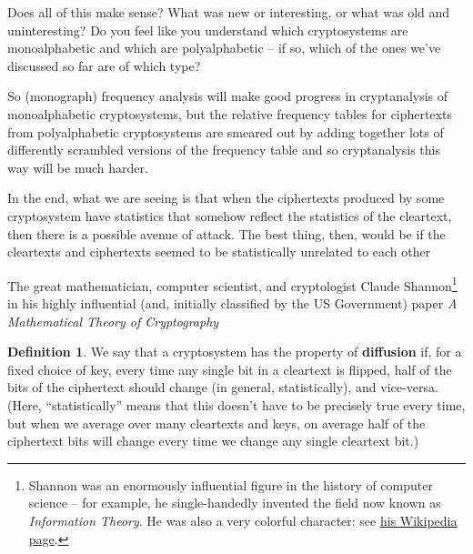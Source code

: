 \documentclass[12pt,letterpaper]{amsbook}
\theoremstyle{definition}
\newtheorem{definition}[theorem]{Definition}
\theoremstyle{remark}
\numberwithin{figure}{section}
\numberwithin{exercise}{chapter}
\numberwithin{section}{chapter}
\numberwithin{equation}{section}
\numberwithin{table}{subsection}
\newcommand{\blue}[1]{{\color{blue}#1}}
\newcommand{\bhref}[2]{{\href{#1}{\blue{#2}}}}
\begin{document}
\vskip2mm
\begin{AZtcb}[label=az:monopolyalphabetic]{}{}
  Does all of this make sense?  What was new or interesting, or what was old
  and uninteresting?  Do you feel like you understand which cryptosystems
  are monoalphabetic and which are polyalphabetic -- if so, which of the ones
  we've discussed so far are of which type?
\end{AZtcb}

So (monograph) frequency analysis will make good progress in cryptanalysis
of monoalphabetic cryptosystems, but the relative frequency tables for
ciphertexts from polyalphabetic cryptosystems are smeared out by adding
together lots of differently scrambled versions of the frequency table and so
cryptanalysis this way will be much harder.

In the end, what we are seeing is that when the ciphertexts produced by some
cryptosystem have statistics that somehow reflect the statistics of the
cleartext, then there is a possible avenue of attack.  The best thing, then,
would be if the cleartexts and ciphertexts seemed to be statistically
unrelated to each other

The great mathematician, computer scientist, and cryptologist Claude Shannon\footnote{\tiny Shannon was an enormously influential figure in the history of computer science -- for example, he single-handedly invented the field now known as \textit{Information Theory}.  He
was also a very colorful character: see \bhref{https://en.wikipedia.org/wiki/Claude_Shannon}{his Wikipedia page}.} in his highly influential (and, initially
classified by the US Government) paper \textit{A Mathematical Theory of Cryptography}\cite{shannon1945mathcrypto}
\begin{definition}\label{def:diffusion}
We say that a cryptosystem has the property of \textbf{diffusion} if, for a
fixed choice of key, every time any single bit in a cleartext is flipped,
half of the bits of the ciphertext should change (in general, statistically),
and vice-versa.  (Here, ``statistically'' means that this doesn't have to be
precisely true every time, but when we average over many cleartexts and keys,
on average half of the ciphertext bits will change every time we change any
single cleartext bit.)
\end{definition}
\end{document}
